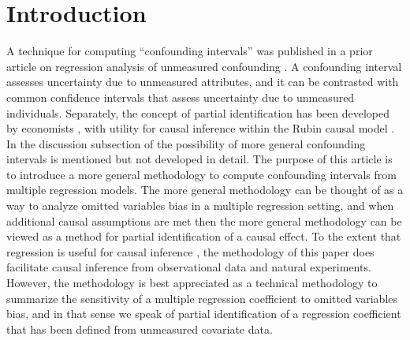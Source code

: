 \documentclass[11pt]{amsart}
\begin{document}
\section{Introduction}
\label{introduction}
A technique for computing ``confounding intervals'' was published in a prior article on regression analysis of unmeasured confounding \citep{Knaeble2020}. A confounding interval assesses uncertainty due to unmeasured attributes, and it can be contrasted with common confidence intervals that assess uncertainty due to unmeasured individuals. Separately, the concept of partial identification has been developed by economists \citep{Tamer2010}, with utility for causal inference within the Rubin causal model \citep{Imbens2015}. In the discussion subsection of \cite{Knaeble2020} the possibility of more general confounding intervals is mentioned but not developed in detail. The purpose of this article is to introduce a more general methodology to compute confounding intervals from multiple regression models. The more general methodology can be thought of as a way to analyze omitted variables bias in a multiple regression setting, and when additional causal assumptions are met then the more general methodology can be viewed as a method for partial identification of a causal effect. To the extent that regression is useful for causal inference \cite{McNamee2005,Angrist2009}, the methodology of this paper does facilitate causal inference from observational data and natural experiments. However, the methodology is best appreciated as a technical methodology to summarize the sensitivity of a multiple regression coefficient to omitted variables bias, and in that sense we speak of partial identification of a regression coefficient that has been defined from unmeasured covariate data.
\end{document}
